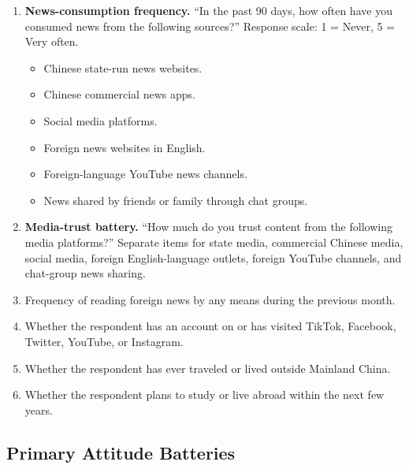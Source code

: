 \documentclass[12pt,american]{article}
\begin{document}
\begin{enumerate}[label=\arabic*., leftmargin=1.5em]
\item \textbf{News-consumption frequency.} ``In the past 90 days, how often have you consumed news from the following sources?'' Response scale: 1 = Never, 5 = Very often.
\begin{itemize}
\item Chinese state-run news websites.
\item Chinese commercial news apps.
\item Social media platforms.
\item Foreign news websites in English.
\item Foreign-language YouTube news channels.
\item News shared by friends or family through chat groups.
\end{itemize}
\item \textbf{Media-trust battery.} ``How much do you trust content from the following media platforms?'' Separate items for state media, commercial Chinese media, social media, foreign English-language outlets, foreign YouTube channels, and chat-group news sharing.
\item Frequency of reading foreign news by any means during the previous month.
\item Whether the respondent has an account on or has visited TikTok, Facebook, Twitter, YouTube, or Instagram.
\item Whether the respondent has ever traveled or lived outside Mainland China.
\item Whether the respondent plans to study or live abroad within the next few years.
\end{enumerate}

\subsection{Primary Attitude Batteries}\label{app:attitudes}
\end{document}

